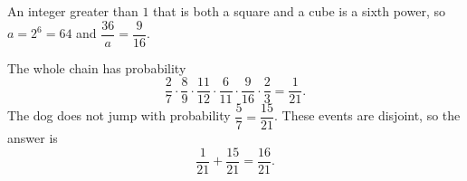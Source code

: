 An integer greater than $1$ that is both a square and a cube is a sixth power, so $a=2^6=64$ and $\dfrac{36}{a}=\dfrac{9}{16}$.

The whole chain has probability
\[\dfrac27\cdot\dfrac89\cdot\dfrac{11}{12}\cdot\dfrac{6}{11}\cdot\dfrac{9}{16}\cdot\dfrac23=\dfrac{1}{21}.\]
The dog does not jump with probability $\dfrac57=\dfrac{15}{21}$. These events are disjoint, so the answer is
\[\dfrac{1}{21}+\dfrac{15}{21}=\boxed{\dfrac{16}{21}}.\]
